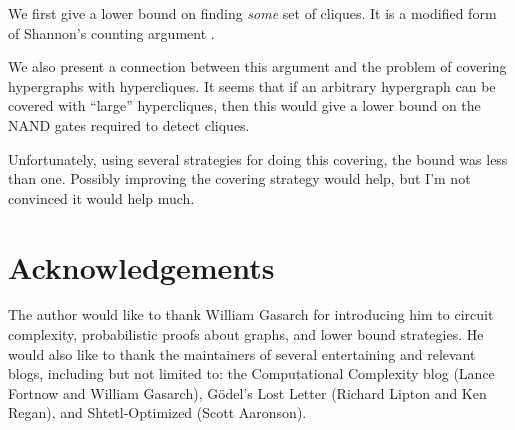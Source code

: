 \documentclass[12pt]{article}
\theoremstyle{definition}
\begin{document}
We first give a lower bound on finding {\em some} set of cliques.
It is a modified form of Shannon's counting argument
\cite{shannon_synthesis_1949}.

We also present a connection between this argument and the problem of covering
hypergraphs with hypercliques.
It seems that if an arbitrary hypergraph can be covered with 
``large'' hypercliques,
then this would give a lower bound on the NAND gates required to
detect cliques.

Unfortunately, using several strategies for doing this covering,
the bound was less than one. Possibly improving the covering
strategy would help, but I'm not convinced it would help much.

\section{Acknowledgements}

The author would like to thank William Gasarch for introducing him
to circuit complexity, probabilistic proofs about graphs,
and lower bound strategies.
He would also like to thank the maintainers of
several entertaining and relevant blogs, including but
not limited to: the Computational Complexity blog
(Lance Fortnow and William Gasarch), 
G\"odel's Lost Letter (Richard Lipton and Ken Regan),
and Shtetl-Optimized (Scott Aaronson). 



\end{document}
